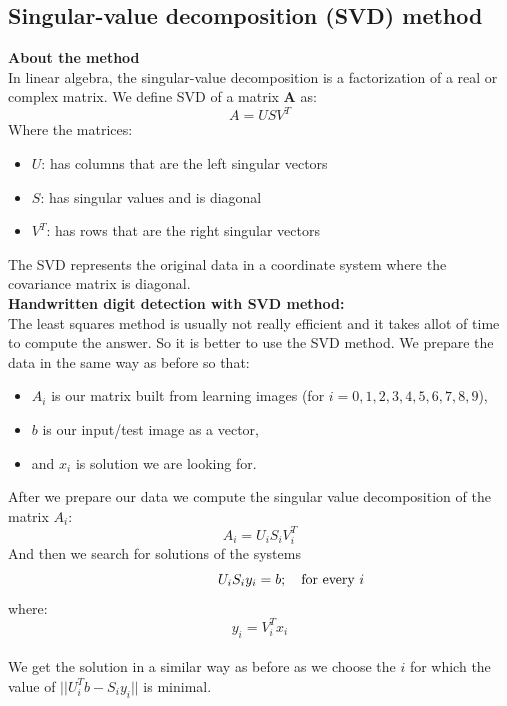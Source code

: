 \documentclass[12pt]{article}
\begin{document}
\newpage
\subsection{Singular-value decomposition (SVD) method}
\textbf{About the method}\\
\newline
In linear algebra, the singular-value decomposition is a factorization of a real or complex matrix.
We define SVD of a matrix \textbf{A} as:\\
\[
A = U S V^{T}
\]
\newline
Where the matrices:
\begin{itemize}
	\item $U$: has columns that are the left singular vectors
	\item $S$: has singular values and is diagonal
	\item $V^{T}$: has rows that are the right singular vectors
\end{itemize}
The SVD represents the original data in a coordinate system where the covariance matrix is diagonal.\\
\newline
\textbf{Handwritten digit detection with SVD method:}\\
\newline
The least squares method is usually not really efficient and it takes allot of time to compute the answer. So it is better to use the SVD method. We prepare the data in the same way as before so that:
\begin{itemize}
	\item $A_{i}$ is our matrix built from learning images (for $i = 0, 1, 2, 3, 4, 5, 6, 7, 8, 9$),
	\item $b$ is our input/test image as a vector,
	\item and $x_{i}$ is solution we are looking for.
\end{itemize}
After we prepare our data we compute the singular value decomposition of the matrix $A_{i}$:\\
\[
A_{i} = U_{i} S_{i} V^{T}_{i}
\]
\newline
And then we search for solutions of the systems 
\[
U_{i} S_{i} y_{i} = b ;\quad \rlap{\text for every {$i$}}
\]
\newline
where:
\[
y_{i} = V^{T}_{i} x_{i}
\]\\
\newline
We get the solution in a similar way as before as we choose the $i$ for which the value of  \textbf{$|| U^{T}_{i} b - S_{i}y_{i} ||$}  is minimal.\\
\end{document}
